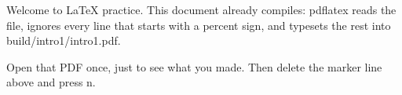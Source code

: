 \documentclass{article}
\begin{document}
Welcome to \LaTeX{} practice. This document already compiles: pdflatex
reads the file, ignores every line that starts with a percent sign, and
typesets the rest into build/intro1/intro1.pdf.

Open that PDF once, just to see what you made. Then delete the marker
line above and press n.
\end{document}
